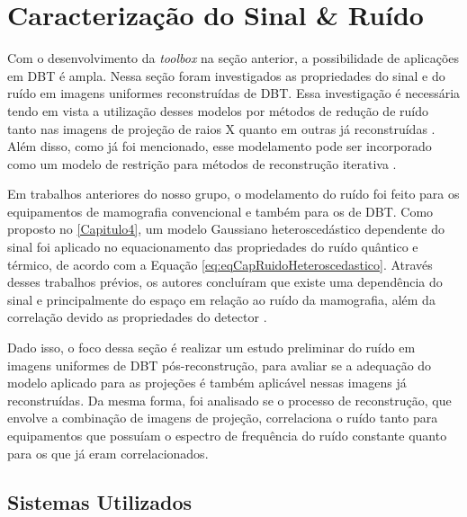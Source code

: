\section{Caracterização do Sinal  \& Ruído}

Com o desenvolvimento da \textit{toolbox} na seção anterior, a possibilidade de aplicações em \acs{DBT} é ampla. Nessa seção foram investigados as propriedades do sinal e do ruído em imagens uniformes reconstruídas de \acs{DBT}. Essa investigação é necessária tendo em vista a utilização desses modelos por métodos de redução de ruído tanto nas imagens de projeção de raios X quanto em outras já reconstruídas \cite{wu2012dose, borges2017pipeline}. Além disso, como já foi mencionado, esse modelamento pode ser incorporado como um modelo de restrição para métodos de reconstrução iterativa \cite{zheng2018detector}. 

Em trabalhos anteriores do nosso grupo, o modelamento do ruído foi feito para os equipamentos de mamografia convencional e também para os de \acs{DBT}. Como proposto no \autoref{Capitulo4}, um modelo  Gaussiano heteroscedástico dependente do sinal foi aplicado no equacionamento das propriedades do ruído quântico e térmico, de acordo com a Equação \ref{eq:eqCapRuidoHeteroscedastico}.  Através desses trabalhos prévios, os autores concluíram que existe uma dependência do sinal e principalmente do espaço em relação ao ruído da mamografia, além da correlação devido as propriedades do detector \cite{borges2017pipeline,borges2017method, borges2018restoration,brito2018application,guerrero2018}. 

Dado isso, o foco dessa seção é realizar um estudo preliminar do ruído em imagens uniformes de \acs{DBT} pós-reconstrução, para avaliar se a adequação do modelo aplicado para as projeções é também aplicável nessas imagens já reconstruídas. Da mesma forma, foi analisado se o processo de reconstrução, que envolve a combinação de imagens de projeção, correlaciona o ruído tanto para equipamentos que possuíam o espectro de frequência do ruído constante quanto para os que já eram correlacionados.   

\subsection{Sistemas Utilizados}

